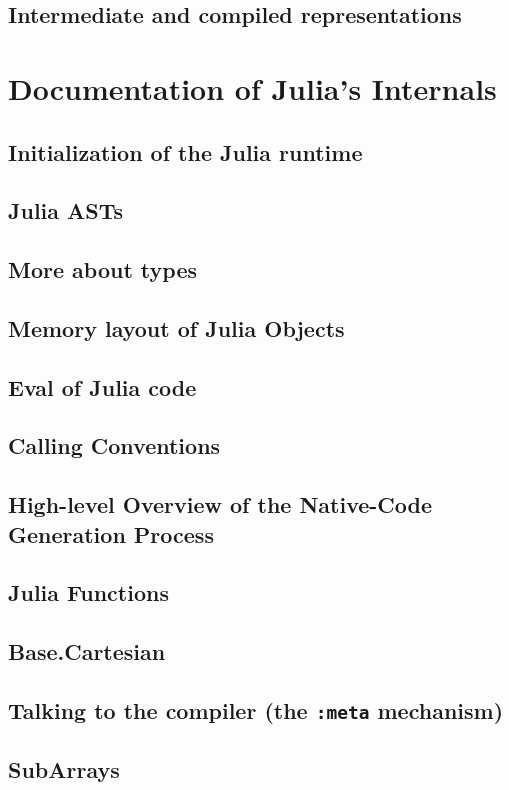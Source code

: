     \section{Intermediate and compiled representations}
\chapter{Documentation of Julia's Internals}
    \section{Initialization of the Julia runtime}
    \section{Julia ASTs}
    \section{More about types}
    \section{Memory layout of Julia Objects}
    \section{Eval of Julia code}
    \section{Calling Conventions}
    \section{High-level Overview of the Native-Code Generation Process}
    \section{Julia Functions}
    \section{Base.Cartesian}
    \section{Talking to the compiler (the \texttt{:meta} mechanism)}
    \section{SubArrays}
